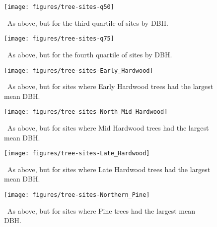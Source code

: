 \clearpage

\begin{figure}[ht]
  \centering
  \texttt{[image: figures/tree-sites-q50]}
  \caption{\label{fig:tree-sites-q50}\
    As above, but for the third quartile of sites by DBH.\@
  }
\end{figure}

\clearpage

\begin{figure}[ht]
  \centering
  \texttt{[image: figures/tree-sites-q75]}
  \caption{\label{fig:tree-sites-q75}\
    As above, but for the fourth quartile of sites by DBH.\@
  }
\end{figure}

\clearpage

\begin{figure}[ht]
  \centering
  \texttt{[image: figures/tree-sites-Early\_Hardwood]}
  \caption{\label{fig:tree-sites-EH}\
    As above, but for sites where Early Hardwood trees had the largest mean DBH.\@
  }
\end{figure}

\clearpage

\begin{figure}[ht]
  \centering
  \texttt{[image: figures/tree-sites-North\_Mid\_Hardwood]}
  \caption{\label{fig:tree-sites-MH}\
    As above, but for sites where Mid Hardwood trees had the largest mean DBH.\@
  }
\end{figure}

\clearpage

\begin{figure}[ht]
  \centering
  \texttt{[image: figures/tree-sites-Late\_Hardwood]}
  \caption{\label{fig:tree-sites-LH}\
    As above, but for sites where Late Hardwood trees had the largest mean DBH.\@
  }
\end{figure}

\clearpage

\begin{figure}[ht]
  \centering
  \texttt{[image: figures/tree-sites-Northern\_Pine]}
  \caption{\label{fig:tree-sites-P}\
    As above, but for sites where Pine trees had the largest mean DBH.\@
  }
\end{figure}

